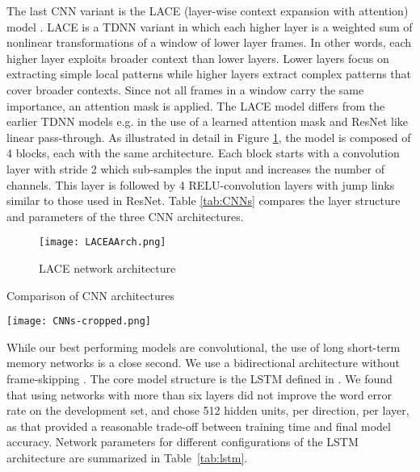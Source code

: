 \documentclass{article}
\begin{document}
The last CNN variant is the LACE (layer-wise context expansion with attention) model \cite{yu2016deep}. LACE is a TDNN \cite{waibel1989phoneme} variant in which each higher layer is a weighted sum of nonlinear transformations of a window of lower layer frames. In other words, each higher layer exploits broader context than lower layers. Lower layers focus on extracting simple local patterns while higher layers extract complex patterns that cover broader contexts.
Since not all frames in a window carry the same importance, an attention mask is applied.
The LACE model differs from the earlier TDNN models e.g. \cite{waibel1989phoneme,waibel1989consonant} in the use of a learned attention mask and ResNet like
linear pass-through. As illustrated in detail in Figure \ref{fig:LACE}, the model is composed of 4 blocks, each with the same architecture. Each block starts with a convolution layer with stride 2 which sub-samples the input and increases the number of channels. This layer is followed by 4 RELU-convolution layers with jump links similar to those used in ResNet. 
Table \ref{tab:CNNs} compares the layer structure and parameters of the three CNN architectures. 


\begin{figure}[t]
\centering
\texttt{[image: LACEAArch.png]}
\caption{LACE network architecture}
\label{fig:LACE}
\end{figure}

\begin{table}[t]
\centering
\caption{Comparison of CNN architectures}
\label{tab:CNNs}
\texttt{[image: CNNs-cropped.png]}
\end{table}





















While our best performing models are convolutional, the
use of long short-term memory networks is a close second. We use a 
bidirectional architecture \cite{graves2005framewise} without frame-skipping
\cite{sak2015fast}. The core model structure is the LSTM defined in 
\cite{sak2014long}. We found that using networks with more than six
layers did not improve the word error rate on the development set,
and chose 512 hidden units, per direction, per layer, as that provided a 
reasonable trade-off between training time and final model accuracy.
Network parameters for different configurations of the LSTM architecture are summarized in Table~\ref{tab:lstm}.
\end{document}
